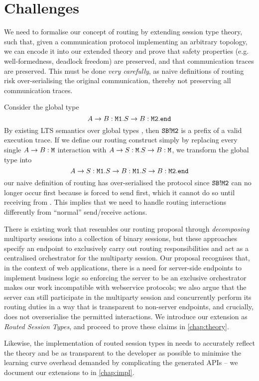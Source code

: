 \section{Challenges}
\label{section:routerchallenges}

We need to formalise our concept of routing by extending session
type theory, such that, given a communication protocol implementing 
an arbitrary topology, we can encode it into our extended theory and
prove that safety properties (e.g. well-formedness, deadlock freedom)
are preserved, and that communication traces are preserved.
This must be done \textit{very carefully}, as
naive definitions of routing risk 
over-serialising the original communication,
thereby not preserving all communication traces.

\begin{example}
Consider the global type
\[
A \to B: \texttt{M1}. S \to B: \texttt{M2}. \texttt{end}
\]
By existing LTS semantics over
global types \cite{characterisation}, 
then ${\mathtt{S}}{\mathtt{B}}!{\texttt{M2}}$
is a prefix of a valid execution trace.
If we define our routing construct simply by replacing every single
$A \to B: \texttt{M}$ interaction with $A \to S: \texttt{M}.
S \to B: \texttt{M}$, we transform the global type into
\[
A \to S: \texttt{M1}. S \to B: \texttt{M1}. S \to B: \texttt{M2}. \texttt{end}
\]
our naive definition of routing has over-serialised the protocol
since ${\mathtt{S}}{\mathtt{B}}!{\texttt{M2}}$ can no longer occur first because 
is forced to send  first, which it cannot do so until receiving
from .
This implies that we need to handle routing interactions differently
from ``normal'' send/receive actions.
\end{example}

There is existing work \cite{LinearDecomp, BinaryDecomp, BinaryDuality}
that resembles our routing proposal through
\textit{decomposing} multiparty sessions into a collection
of binary sessions,
but these approaches
specify an endpoint to exclusively carry out
routing responsibilities and act as a centralised orchestrator 
for the multiparty session.
Our proposal recognises that, in the context of web applications,
there is a need for server-side endpoints to implement business logic
so enforcing the server to be an exclusive orchestrator makes our work
incompatible with webservice protocols; 
we also argue that the server can still participate in the 
multiparty session and concurrently perform its routing duties
in a way that is transparent to non-server endpoints, and crucially,
does not overserialise the permitted interactions. 
We introduce our extension as \textit{Routed Session Types},
and proceed to prove these claims in \cref{chap:theory}.

Likewise, the implementation of routed session types 
in  needs to accurately reflect the theory
and be as transparent to the developer as possible to minimise
the learning curve overhead demanded 
by complicating the generated APIs -- we document our extensions
to  in \cref{chap:impl}.